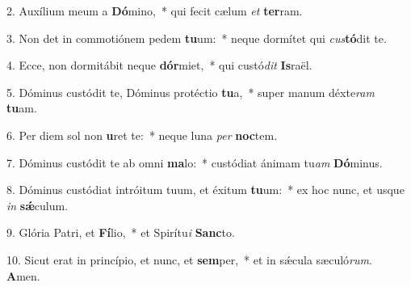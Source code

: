 2. Auxílium meum a \textbf{Dó}mino,~*  qui fecit cælum \textit{et} \textbf{ter}ram.\

3. Non det in commotiónem pedem \textbf{tu}um:~*  neque dormítet qui \textit{cus}\textbf{tó}dit te.\

4. Ecce, non dormitábit neque \textbf{dór}miet,~*  qui custó\textit{dit} \textbf{Is}raël.\

5. Dóminus custódit te, Dóminus protéctio \textbf{tu}a,~*  super manum déxte\textit{ram} \textbf{tu}am.\

6. Per diem sol non \textbf{u}ret te:~*  neque luna \textit{per} \textbf{noc}tem.\

7. Dóminus custódit te ab omni \textbf{ma}lo:~*  custódiat ánimam tu\textit{am} \textbf{Dó}minus.\

8. Dóminus custódiat intróitum tuum, et éxitum \textbf{tu}um:~*  ex hoc nunc, et usque \textit{in} \textbf{sǽ}culum.\

9. Glória Patri, et \textbf{Fí}lio,~*  et Spirítu\textit{i} \textbf{Sanc}to.\

10. Sicut erat in princípio, et nunc, et \textbf{sem}per,~*  et in sǽcula sæculó\textit{rum}. \textbf{A}men.\

